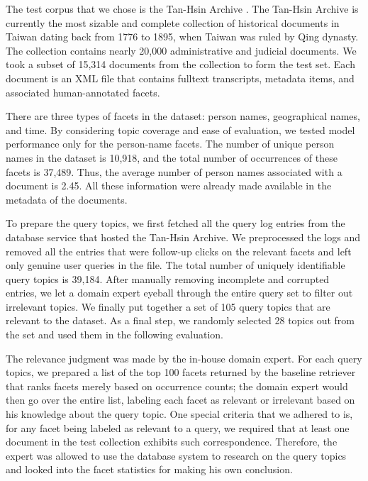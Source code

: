 The test corpus that we chose is the Tan-Hsin Archive .  The
Tan-Hsin Archive is currently the most sizable and complete collection of
historical documents in Taiwan dating back from 1776 to 1895, when Taiwan was
ruled by Qing dynasty.  The collection contains nearly 20,000 administrative
and judicial documents.  We took a subset of 15,314 documents from the
collection to form the test set.  Each document is an XML file that contains
fulltext transcripts, metadata items, and associated human-annotated facets.  

There are three types of facets in the dataset: person names, geographical
names, and time.  By considering topic coverage and ease of evaluation, we
tested model performance only for the person-name facets.  The number of unique
person names in the dataset is 10,918, and the total number of occurrences of
these facets is 37,489.  Thus, the average number of person names associated
with a document is 2.45.  All these information were already made available in
the metadata of the documents.  

To prepare the query topics, we first fetched all the query log entries from
the database service that hosted the Tan-Hsin Archive.  We preprocessed the
logs and removed all the entries that were follow-up clicks on the relevant
facets and left only genuine user queries in the file.  The total number of
uniquely identifiable query topics is 39,184.  After manually removing
incomplete and corrupted entries, we let a domain expert eyeball through the
entire query set to filter out irrelevant topics.   We finally put together a
set of 105 query topics that are relevant to the dataset.  As a final step, we
randomly selected 28 topics out from the set and used them in the following
evaluation.

The relevance judgment was made by the in-house domain expert.  For each query
topics, we prepared a list of the top 100 facets returned by the baseline
retriever that ranks facets merely based on occurrence counts; the domain
expert would then go over the entire list, labeling each facet as relevant or
irrelevant based on his knowledge about the query topic.  One special criteria
that we adhered to is, for any facet being labeled as relevant to a query, we
required that at least one document in the test collection exhibits such
correspondence.  Therefore, the expert was allowed to use the database system
to research on the query topics and looked into the facet statistics for making
his own conclusion.

